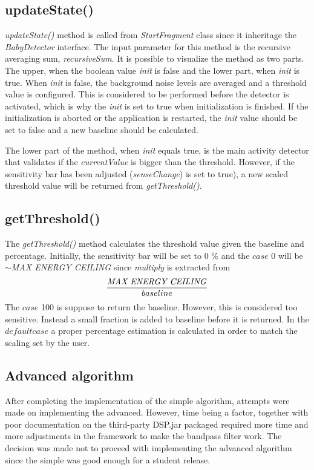\subsection{updateState()}
\emph{updateState()} method is called from \emph{StartFragment} class since it
inheritage the \emph{BabyDetector} interface. The input parameter for this
method is the recursive averaging sum, \emph{recursiveSum}. It is possible to
visualize the method as two parts. The upper, when the boolean value \emph{init}
is false and the lower part, when \emph{init} is true. When \emph{init} is
false, the background noise levels are averaged and a threshold value is
configured. This is considered to be performed before the detector is activated,
which is why the \emph{init} is set to true when initialization is finished. If
the initialization is aborted or the application is restarted, the \emph{init}
value should be set to false and a new baseline should be calculated.

The lower part of the method, when \emph{init} equals true, is the main activity
detector that validates if the \emph{currentValue} is bigger than the threshold.
However, if the sensitivity bar has been adjusted (\emph{senseChange}) is set to
true), a new scaled threshold value will be returned from \emph{getThreshold()}.

\subsection{getThreshold()}
The \emph{getThreshold()} method calculates the threshold value given the
baseline and percentage. Initially, the sensitivity bar will be set to 0 \% and 
the $case$ 0 will be $\sim$\emph{MAX ENERGY CEILING} since \emph{multiply} is 
extracted from 
\[
\frac{\mbox{\emph{MAX ENERGY CEILING}}}{baseline}
\]
The $case$ 100 is suppose to return the baseline. However, this is considered
too sensitive. Instead a small fraction is added to baseline before it is
returned. In the $default case$ a proper percentage estimation is calculated in 
order to match the scaling set by the user.


\subsection{Advanced algorithm}
After completing the implementation of the simple algorithm, attempts were made
on implementing the advanced. However, time being a factor, together with poor
documentation on the third-party DSP.jar packaged required more time and more
adjustments in the framework to make the bandpass filter work. The decision was
made not to proceed with implementing the advanced algorithm since the simple
was good enough for a student release.
